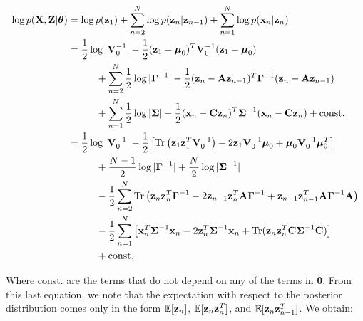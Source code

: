 \documentclass[11pt]{article}
\begin{document}
\begin{align}
	\log p({\bf X}, {\bf Z}\vert \boldsymbol\theta) &= \log p({\bf z}_1) + \sum_{n=2}^N \log p({\bf z}_n\vert {\bf z}_{n-1}) + \sum_{n=1}^N \log p({\bf x}_n\vert {\bf z}_n)\\
	   &=\frac{1}{2}\log\vert{\bf V}_0^{-1}\vert - \frac{1}{2}({\bf z}_1 - \boldsymbol\mu_0)^T{\bf V}_0^{-1}({\bf z}_1 - \boldsymbol\mu_0) \nonumber \\
	   &\hspace{1cm}+ \sum_{n=2}^N \frac{1}{2}\log\vert\boldsymbol\Gamma^{-1}\vert - \frac{1}{2}({\bf z}_n - {\bf A z}_{n-1})^T\boldsymbol{\Gamma}^{-1}({\bf z}_n - {\bf A z}_{n-1}) \nonumber \\
	   &\hspace{1cm}+\sum_{n=1}^N \frac{1}{2}\log\vert\boldsymbol\Sigma\vert -\frac{1}{2}({\bf x}_n - {\bf C z}_n)^T \boldsymbol{\Sigma}^{-1}({\bf x}_n - {\bf C z}_n) + \text{const.}\\
	   &= \frac{1}{2}\log \vert
	  {\bf V}_0^{-1}\vert -\frac{1}{2}\left[\text{Tr}\left({\bf z}_1 {\bf z}_1^T {\bf V}_0^{-1}\right) -2 {\bf z}_1{\bf V}_0^{-1}\boldsymbol\mu_0 + \boldsymbol\mu_0 {\bf V}_0^{-1}\boldsymbol\mu_0^T\right] \nonumber \\
	  &\hspace{1cm}+ \frac{N-1}{2}\log\vert\boldsymbol\Gamma^{-1}\vert + \frac{N}{2}\log\vert \boldsymbol\Sigma^{-1}\vert \nonumber \\
	  &\hspace{1cm}-\frac{1}{2} \sum_{n=2}^{N}\text{Tr}\left({\bf z}_n{\bf z}_n^T\boldsymbol\Gamma^{-1} -2 {\bf z}_{n-1}{\bf z}_n^T{\bf A}\boldsymbol\Gamma^{-1} +  {\bf z}_{n-1}{\bf z}_{n-1}^T{\bf A}\boldsymbol\Gamma^{-1}{\bf A}\right) \nonumber\\
	  &\hspace{1cm}-\frac{1}{2}\sum_{n=1}^N\left[{\bf x}_n^T\boldsymbol{\Sigma}^{-1}{\bf x}_n-2{\bf z}_n^T\boldsymbol\Sigma^{-1}{\bf x}_n + \text{Tr}({\bf z}_n{\bf z}_n^T{\bf C}\boldsymbol\Sigma^{-1}{\bf C})\right] \nonumber\\
	  &\hspace{1cm} + \text{const.}
\end{align}

Where const. are the terms that do not depend on any of the terms in $\boldsymbol{\theta}$. From this last equation, we note that the expectation with respect to the posterior distribution comes only in the form $\mathbb{E}[{\bf z}_n]$, $\mathbb{E}[{\bf z}_n{\bf z}_{n}^{T}]$, and  $\mathbb{E}[{\bf z}_n{\bf z}_{n-1}^{T}]$. We obtain:
\end{document}
